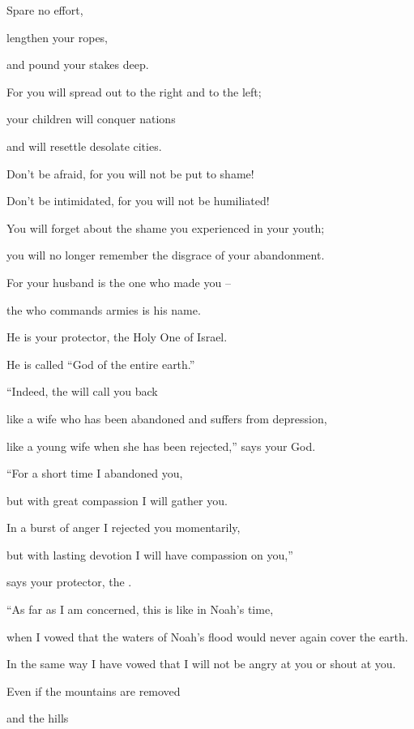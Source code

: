 {\par }{\Q Spare
no
effort,
\par }{\Q lengthen
your ropes,
\par }{\Q and pound
your stakes
deep.
\par }{\Q {}For
you will spread out
to the right
and to the left;
\par }{\Q your children
will conquer
nations
\par }{\Q and will resettle
desolate
cities.
\par }{\Q {}Don’t
be afraid,
for
you will not
be put to shame!
\par }{\Q Don’t
be intimidated,
for
you will not
be humiliated!
\par }{\Q You will forget
about the shame
you experienced in your youth;
\par }{\Q you will no
longer
remember
the disgrace
of your abandonment.
\par }{\Q {}For
your husband
is the one who made you –
\par }{\Q the
{} who commands armies is his name.
\par }{\Q He is your protector, the Holy One of Israel.
\par }{\Q He is called “God of the entire earth.”
\par }{\Q {}“Indeed, the
{}
will call
you back
\par }{\Q like a wife
who
has been abandoned
and suffers
from depression,
\par }{\Q like a young
wife
when
she has been rejected,”
says
your God.
\par }{\Q {}“For a short
time
I abandoned
you,
\par }{\Q but with great
compassion
I will gather you.
\par }{\Q {}In a burst
of anger
I rejected
you momentarily,
\par }{\Q but with
lasting
devotion
I will have compassion
on you,”
\par }{\Q says
your protector,
the {}.
\par }{\Q {}“As
far as I am concerned,
this
is like
in Noah’s
time,
\par }{\Q when I vowed
that
the waters
of Noah’s
flood would never again
cover the earth.
\par }{\Q In the same
way I have vowed
that I will not be angry
at you or shout at you.
\par }{\Q {}Even if
the mountains
are removed
\par }{\Q and the hills
}

